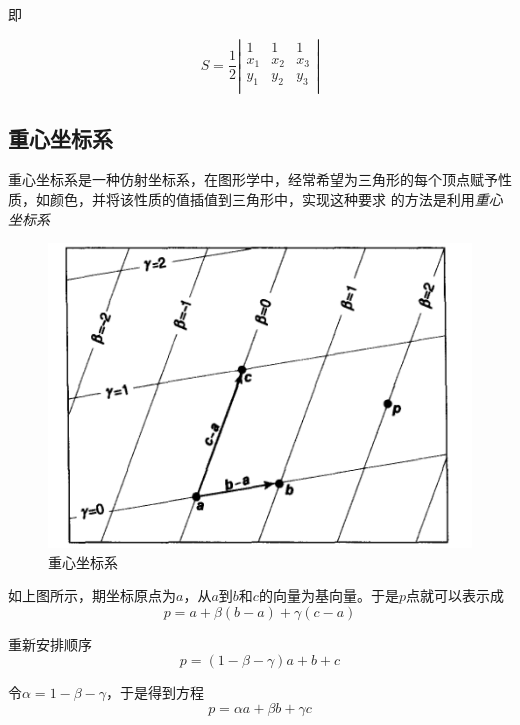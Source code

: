 即

\begin{equation}
    S=\frac{1}{2}\left|
        \begin{array}{ccc}
            1   &   1   & 1  \\
            x_1 &  x_2  & x_3\\
            y_1 &  y_2  & y_3\\
        \end{array}
    \right|
\end{equation}

\subsection*{重心坐标系}

重心坐标系是一种仿射坐标系，在图形学中，经常希望为三角形的每个顶点赋予性质，如颜色，并将该性质的值插值到三角形中，实现这种要求
的方法是利用\textsl{重心坐标系}

\begin{figure}[H]
    \centering
    \includegraphics[scale=0.35]{figures/重心坐标系.png}
    \caption{重心坐标系}
\end{figure}

如上图所示，期坐标原点为$a$，从$a$到$b$和$c$的向量为基向量。于是$p$点就可以表示成
\begin{equation}
    p=a+\beta(b-a)+\gamma(c-a)
\end{equation}

重新安排顺序
\begin{equation}
    p=(1-\beta-\gamma)a+b+c
\end{equation}

令$\alpha=1-\beta-\gamma$，于是得到方程
\begin{equation}
    p=\alpha a+\beta b+\gamma c
\end{equation}


